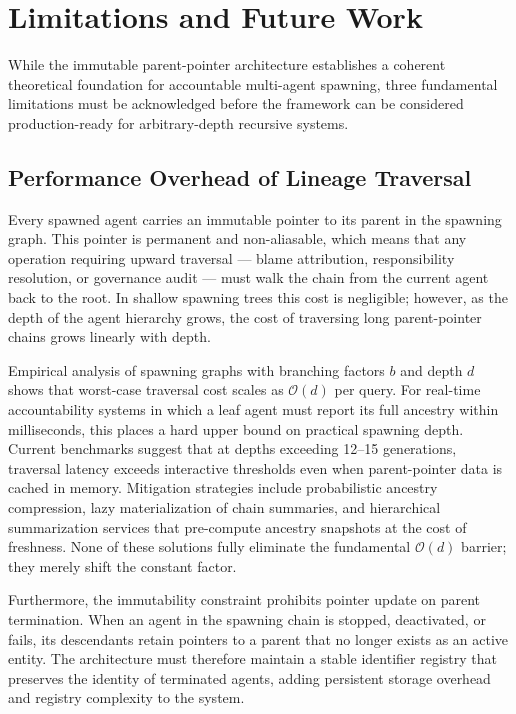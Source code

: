 \section{Limitations and Future Work}

While the immutable parent-pointer architecture establishes a coherent
theoretical foundation for accountable multi-agent spawning, three
fundamental limitations must be acknowledged before the framework can be
considered production-ready for arbitrary-depth recursive systems.

\subsection{Performance Overhead of Lineage Traversal}

Every spawned agent carries an immutable pointer to its parent in the
spawning graph. This pointer is permanent and non-aliasable, which means
that any operation requiring upward traversal — blame attribution,
responsibility resolution, or governance audit — must walk the chain from
the current agent back to the root. In shallow spawning trees this cost is
negligible; however, as the depth of the agent hierarchy grows, the cost
of traversing long parent-pointer chains grows linearly with depth.

Empirical analysis of spawning graphs with branching factors $b$ and
depth $d$ shows that worst-case traversal cost scales as $\mathcal{O}(d)$
per query. For real-time accountability systems in which a leaf agent must
report its full ancestry within milliseconds, this places a hard upper
bound on practical spawning depth. Current benchmarks suggest that at
depths exceeding 12--15 generations, traversal latency exceeds
interactive thresholds even when parent-pointer data is cached in memory.
Mitigation strategies include probabilistic ancestry compression, lazy
materialization of chain summaries, and hierarchical summarization
services that pre-compute ancestry snapshots at the cost of freshness.
None of these solutions fully eliminate the fundamental $\mathcal{O}(d)$
barrier; they merely shift the constant factor.

Furthermore, the immutability constraint prohibits pointer update on
parent termination. When an agent in the spawning chain is stopped,
deactivated, or fails, its descendants retain pointers to a parent that
no longer exists as an active entity. The architecture must therefore
maintain a stable identifier registry that preserves the identity of
terminated agents, adding persistent storage overhead and registry
complexity to the system.

